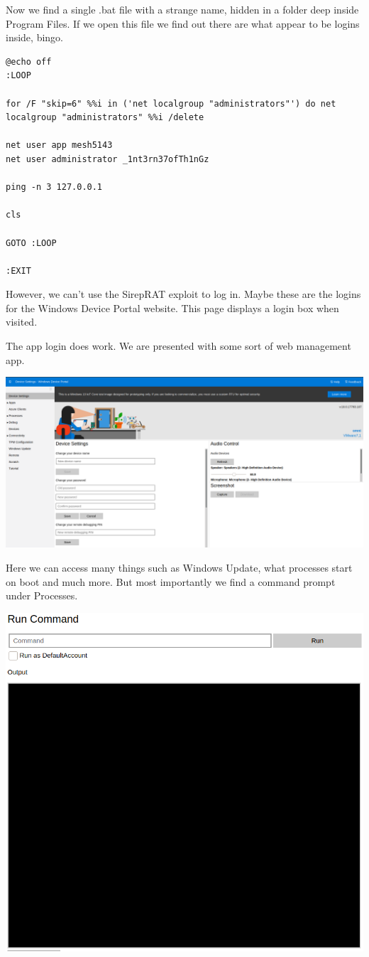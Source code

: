 \documentclass[../main.tex]{subfiles}
\begin{document}
Now we find a single .bat file with a strange name, hidden in a folder deep inside Program Files. If we open this file we find out there are what appear to be logins inside, bingo.

\begin{lstlisting}
@echo off
:LOOP

for /F "skip=6" %%i in ('net localgroup "administrators"') do net localgroup "administrators" %%i /delete

net user app mesh5143
net user administrator _1nt3rn37ofTh1nGz

ping -n 3 127.0.0.1

cls

GOTO :LOOP

:EXIT
\end{lstlisting}

However, we can't use the SirepRAT exploit to log in. Maybe these are the logins for the Windows Device Portal website. This page displays a login box when visited.

The app login does work. We are presented with some sort of web management app.

\includegraphics[width=\linewidth]{images/Wannes/omni_web.png}

Here we can access many things such as Windows Update, what processes start on boot and much more. But most importantly we find a command prompt under Processes. 

\begin{center}
  \includegraphics[width=0.75\linewidth]{images/Wannes/omni_web2.png}
\end{center}
\end{document}
